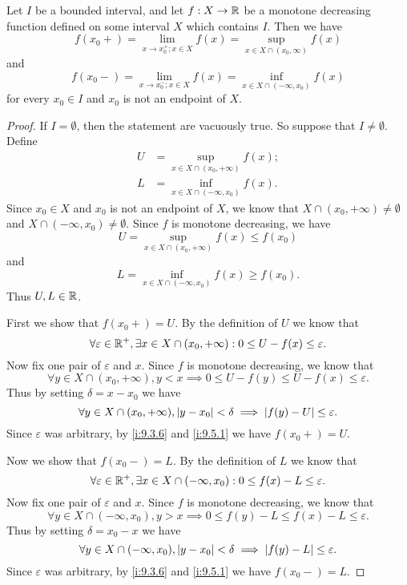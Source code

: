\begin{ac}\label{i:ac:11.8.2}
  Let \(I\) be a bounded interval, and let \(f : X \to \mathbb{R}\) be a monotone decreasing function defined on some interval \(X\) which contains \(I\).
  Then we have
  \[
    f(x_0+) = \lim_{x \to x_0^+ ; x \in X} f(x) = \sup_{x \in X \cap (x_0, \infty)} f(x)
  \]
  and
  \[
    f(x_0-) = \lim_{x \to x_0^- ; x \in X} f(x) = \inf_{x \in X \cap (-\infty, x_0)} f(x)
  \]
  for every \(x_0 \in I\) and \(x_0\) is not an endpoint of \(X\).
\end{ac}

\begin{proof}
  If \(I = \emptyset\), then the statement are vacuously true.
  So suppose that \(I \neq \emptyset\).
  Define
  \begin{align*}
    U & = \sup_{x \in X \cap (x_0, +\infty)} f(x); \\
    L & = \inf_{x \in X \cap (-\infty, x_0)} f(x).
  \end{align*}
  Since \(x_0 \in X\) and \(x_0\) is not an endpoint of \(X\), we know that \(X \cap (x_0, +\infty) \neq \emptyset\) and \(X \cap (-\infty, x_0) \neq \emptyset\).
  Since \(f\) is monotone decreasing, we have
  \[
    U = \sup_{x \in X \cap (x_0, +\infty)} f(x) \leq f(x_0)
  \]
  and
  \[
    L = \inf_{x \in X \cap (-\infty, x_0)} f(x) \geq f(x_0).
  \]
  Thus \(U, L \in \mathbb{R}\).

  First we show that \(f(x_0+) = U\).
  By the definition of \(U\) we know that
  \[
    \forall \varepsilon \in \mathbb{R}^+, \exists x \in X \cap (x_0, +\infty) : 0 \leq U - f(x) \leq \varepsilon.
  \]
  Now fix one pair of \(\varepsilon\) and \(x\).
  Since \(f\) is monotone decreasing, we know that
  \[
    \forall y \in X \cap (x_0, +\infty), y < x \implies 0 \leq U - f(y) \leq U - f(x) \leq \varepsilon.
  \]
  Thus by setting \(\delta = x - x_0\) we have
  \[
    \forall y \in X \cap (x_0, +\infty), \left\lvert y - x_0\right\rvert < \delta \implies \left\lvert f(y) - U\right\rvert \leq \varepsilon.
  \]
  Since \(\varepsilon\) was arbitrary, by \cref{i:9.3.6} and \cref{i:9.5.1} we have \(f(x_0+) = U\).

  Now we show that \(f(x_0-) = L\).
  By the definition of \(L\) we know that
  \[
    \forall \varepsilon \in \mathbb{R}^+, \exists x \in X \cap (-\infty, x_0) : 0 \leq f(x) - L \leq \varepsilon.
  \]
  Now fix one pair of \(\varepsilon\) and \(x\).
  Since \(f\) is monotone decreasing, we know that
  \[
    \forall y \in X \cap (-\infty, x_0), y > x \implies 0 \leq f(y) - L \leq f(x) - L \leq \varepsilon.
  \]
  Thus by setting \(\delta = x_0 - x\) we have
  \[
    \forall y \in X \cap (-\infty, x_0), \left\lvert y - x_0\right\rvert < \delta \implies \left\lvert f(y) - L\right\rvert \leq \varepsilon.
  \]
  Since \(\varepsilon\) was arbitrary, by \cref{i:9.3.6} and \cref{i:9.5.1} we have \(f(x_0-) = L\).
\end{proof}

